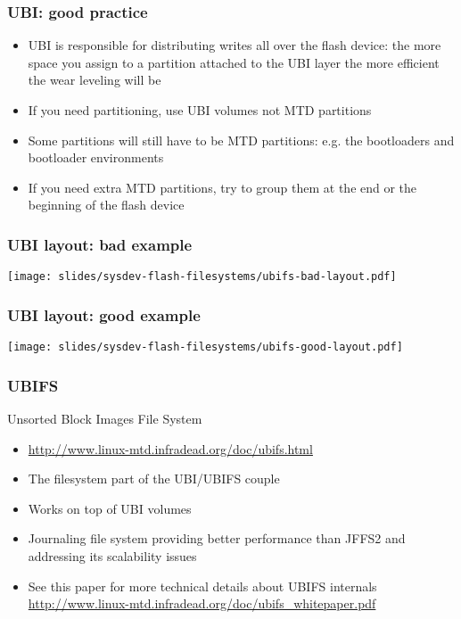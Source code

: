 \begin{frame}
  \frametitle{UBI: good practice}
  \begin{itemize}
  \item UBI is responsible for distributing writes all over the flash
    device: the more space you assign to a partition attached to the
    UBI layer the more efficient the wear leveling will be
  \item If you need partitioning, use UBI volumes not MTD partitions
  \item Some partitions will still have to be MTD partitions: e.g. the
    bootloaders and bootloader environments
  \item If you need extra MTD partitions, try to group them at the end
    or the beginning of the flash device
  \end{itemize}
\end{frame}

\begin{frame}
  \frametitle{UBI layout: bad example}
  \begin{center}
    \texttt{[image: slides/sysdev-flash-filesystems/ubifs-bad-layout.pdf]}
  \end{center}
\end{frame}

\begin{frame}
  \frametitle{UBI layout: good example}
  \begin{center}
    \texttt{[image: slides/sysdev-flash-filesystems/ubifs-good-layout.pdf]}
  \end{center}
\end{frame}

\begin{frame}
  \frametitle{UBIFS}
  Unsorted Block Images File System
  \begin{itemize}
  \item \url{http://www.linux-mtd.infradead.org/doc/ubifs.html}
  \item The filesystem part of the UBI/UBIFS couple
  \item Works on top of UBI volumes
  \item Journaling file system providing better performance than
    JFFS2 and addressing its scalability issues
  \item See this paper for more technical details about UBIFS internals
    \url{http://www.linux-mtd.infradead.org/doc/ubifs_whitepaper.pdf}
  \end{itemize}
\end{frame}

